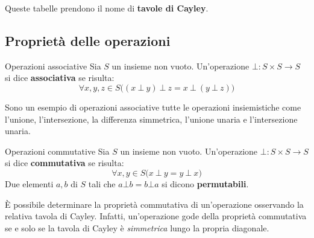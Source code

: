 Queste tabelle prendono il nome di \textbf{tavole di Cayley}.

\subsection{Proprietà delle operazioni}

\begin{defbox}{Operazioni associative}
	Sia $S$ un insieme non vuoto. Un'operazione $\bot: S \times S \longrightarrow S$ si dice \textbf{associativa} se risulta:
	\begin{displaymath}
		\forall x,y,z \in S \bigl( (x \: \bot \: y)\: \bot \: z = x \: \bot \: (y \:  \bot \: z)\bigr)
	\end{displaymath}
\end{defbox}


\begin{example}
	Sono un esempio di operazioni associative tutte le operazioni insiemistiche come l'unione, l'intersezione, la differenza simmetrica, l'unione unaria e l'intersezione unaria.
\end{example}

\begin{defbox}{Operazioni commutative}
	Sia $S$ un insieme non vuoto. Un'operazione $\bot: S \times S \longrightarrow S$ si dice \textbf{commutativa} se risulta:
	\begin{displaymath}
		\forall x,y \in S \bigl(x \: \bot \: y = y \: \bot \: x\bigr)
	\end{displaymath}
	Due elementi $a,b$ di $S$ tali che $a \bot b = b \bot a$ si dicono \textbf{permutabili}.
\end{defbox}


\begin{osservation}
	È possibile determinare la proprietà commutativa di un'operazione osservando la relativa tavola di Cayley. Infatti, un'operazione gode della proprietà commutativa se e solo se la tavola di Cayley è \textit{simmetrica} lungo la propria diagonale.
\end{osservation}


